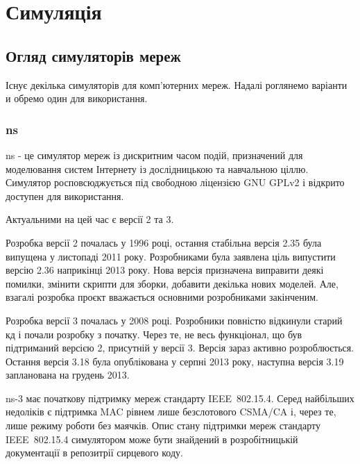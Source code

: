 \documentclass[a4paper,ukrainian,utf8,nocolumnsxix,floatsection]{eskdtext}
\renewcommand\paragraph{\subsubsection}
\let\stdsection\section
\renewcommand\section{\clearpage\stdsection}
\newcommand{\iee}[0]{IEEE~802.15.4\xspace}
\newcommand{\csma}[0]{CSMA/CA\xspace}
\begin{document}
\section{Симуляція}

\subsection{Огляд симуляторів мереж}

Існує декілька симуляторів для комп'ютерних мереж. Надалі роглянемо варіанти и обремо один для використання.

\paragraph{ns}
\label{par:ns}

ns - це симулятор мереж із дискритним часом подій, призначений для моделювання систем Інтернету із дослідницькою та навчальною ціллю. Симулятор росповсюджується під свободною ліцензією GNU GPLv2 і відкрито доступен для використання.

Актуальними на цей час є версії 2 та 3. 

Розробка версії 2 почалась у 1996 році, остання стабільна версія 2.35 була випущена у листопаді 2011 року. Розробниками була заявлена ціль випустити версію 2.36 наприкінці 2013 року. Нова версія призначена виправити деякі помилки, змінити скрипти для зборки, добавити декілька нових моделей. Але, взагалі розробка проєкт вважається основними розробниками закінченим.

Розробка версії 3 почалась у 2008 році. Розробники повністю відкинули старий кд і почали розробку з початку. Через те, не весь функціонал, що був підтриманий версією 2, присутній у версії 3. Версія зараз активно розроблюється. Остання версія 3.18 була опублікована у серпні 2013 року, наступна версія 3.19 запланована на грудень 2013.  

ns-3 має початкову підтримку мереж стандарту \iee. Серед найбільших недоліків є підтримка MAC рівнем лише безслотового \csma і, через те, лише режиму роботи без маячків. Опис стану підтримки мереж стандарту \iee симулятором може бути знайдений в розробітницькій  документації в репозитрії сирцевого коду.
\end{document}

